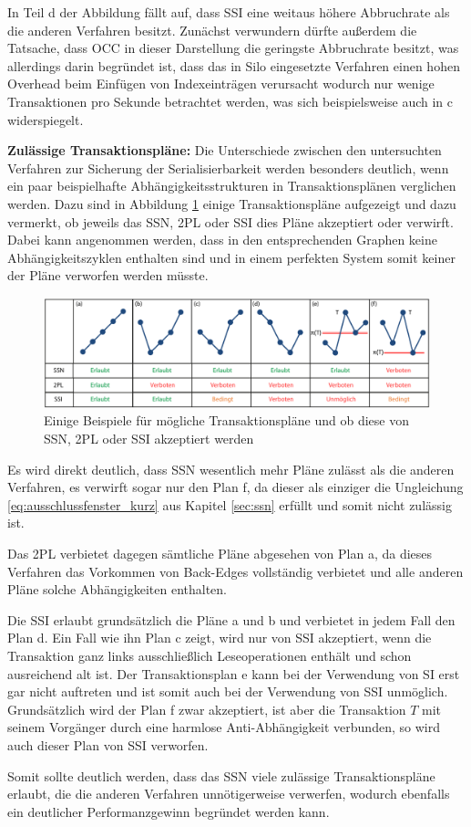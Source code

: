 In Teil d der Abbildung fällt auf, dass SSI eine weitaus höhere Abbruchrate als die anderen Verfahren besitzt.
Zunächst verwundern dürfte außerdem die Tatsache, dass OCC in dieser Darstellung die geringste Abbruchrate besitzt, was allerdings darin begründet ist, dass das in Silo eingesetzte Verfahren einen hohen Overhead beim Einfügen von Indexeinträgen verursacht wodurch nur wenige Transaktionen pro Sekunde betrachtet werden, was sich beispielsweise auch in c widerspiegelt.

\textbf{Zulässige Transaktionspläne:} Die Unterschiede zwischen den untersuchten Verfahren zur Sicherung der Serialisierbarkeit werden besonders deutlich, wenn ein paar beispielhafte Abhängigkeitsstrukturen in Transaktionsplänen verglichen werden.
Dazu sind in Abbildung \ref{fig:transaktionsplan_formen} einige Transaktionspläne aufgezeigt und dazu vermerkt, ob jeweils das SSN, 2PL oder SSI dies Pläne akzeptiert oder verwirft.
Dabei kann angenommen werden, dass in den entsprechenden Graphen keine Abhängigkeitszyklen enthalten sind und in einem perfekten System somit keiner der Pläne verworfen werden müsste.

\begin{figure}
	\includegraphics[width=\textwidth]{img/Figure_6.pdf}
	\caption{Einige Beispiele für mögliche Transaktionspläne und ob diese von SSN, 2PL oder SSI akzeptiert werden}
	\label{fig:transaktionsplan_formen}
\end{figure}

Es wird direkt deutlich, dass SSN wesentlich mehr Pläne zulässt als die anderen Verfahren, es verwirft sogar nur den Plan f, da dieser als einziger die Ungleichung \ref{eq:ausschlussfenster_kurz} aus Kapitel \ref{sec:ssn} erfüllt und somit nicht zulässig ist.

Das 2PL verbietet dagegen sämtliche Pläne abgesehen von Plan a, da dieses Verfahren das Vorkommen von Back-Edges vollständig verbietet und alle anderen Pläne solche Abhängigkeiten enthalten.

Die SSI erlaubt grundsätzlich die Pläne a und b und verbietet in jedem Fall den Plan d.
Ein Fall wie ihn Plan c zeigt, wird nur von SSI akzeptiert, wenn die Transaktion ganz links ausschließlich Leseoperationen enthält und schon ausreichend alt ist.
Der Transaktionsplan e kann bei der Verwendung von SI erst gar nicht auftreten und ist somit auch bei der Verwendung von SSI unmöglich.
Grundsätzlich wird der Plan f zwar akzeptiert, ist aber die Transaktion $T$ mit seinem Vorgänger durch eine harmlose Anti-Abhängigkeit verbunden, so wird auch dieser Plan von SSI verworfen.

Somit sollte deutlich werden, dass das SSN viele zulässige Transaktionspläne erlaubt, die die anderen Verfahren unnötigerweise verwerfen, wodurch ebenfalls ein deutlicher Performanzgewinn begründet werden kann.
